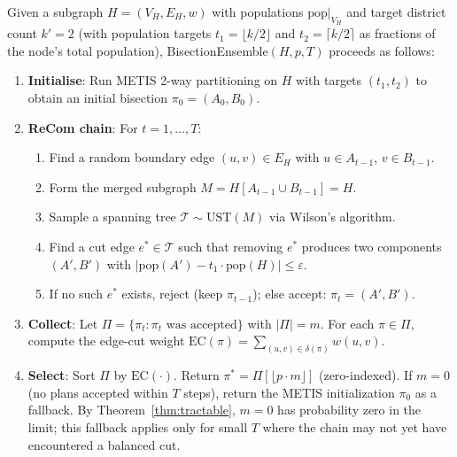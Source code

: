 \begin{definition}
  \label{def:be-primitive}
  Given a subgraph $H = (V_H, E_H, w)$ with populations $\text{pop}|_{V_H}$ and
  target district count $k' = 2$ (with population targets $t_1 = \lfloor k/2
  \rfloor$ and $t_2 = \lceil k/2 \rceil$ as fractions of the node's total
  population), \textup{BisectionEnsemble}$(H, p, T)$ proceeds as follows:
  \begin{enumerate}
    \item \textbf{Initialise}: Run METIS 2-way partitioning on $H$ with targets
          $(t_1, t_2)$ to obtain an initial bisection $\pi_0 = (A_0, B_0)$.
    \item \textbf{ReCom chain}: For $t = 1, \ldots, T$:
          \begin{enumerate}
            \item Find a random boundary edge $(u, v) \in E_H$ with
                  $u \in A_{t-1}$, $v \in B_{t-1}$.
            \item Form the merged subgraph $M = H[A_{t-1} \cup B_{t-1}] = H$.
            \item Sample a spanning tree $\mathcal{T} \sim \text{UST}(M)$ via
                  Wilson's algorithm.
            \item Find a cut edge $e^* \in \mathcal{T}$ such that removing $e^*$
                  produces two components $(A', B')$ with
                  $|\text{pop}(A') - t_1 \cdot \text{pop}(H)| \leq \varepsilon$.
            \item If no such $e^*$ exists, reject (keep $\pi_{t-1}$); else
                  accept: $\pi_t = (A', B')$.
          \end{enumerate}
    \item \textbf{Collect}: Let $\Pi = \{\pi_t : \pi_t \text{ was accepted}\}$
          with $|\Pi| = m$. For each $\pi \in \Pi$, compute the edge-cut
          weight $\text{EC}(\pi) = \sum_{(u,v) \in \delta(\pi)} w(u,v)$.
    \item \textbf{Select}: Sort $\Pi$ by $\text{EC}(\cdot)$. Return
          $\pi^* = \Pi[\lfloor p \cdot m \rfloor]$ (zero-indexed).
          If $m = 0$ (no plans accepted within $T$ steps), return the METIS
          initialization $\pi_0$ as a fallback. By Theorem~\ref{thm:tractable},
          $m = 0$ has probability zero in the limit; this fallback applies only
          for small $T$ where the chain may not yet have encountered a balanced cut.
  \end{enumerate}
\end{definition}

